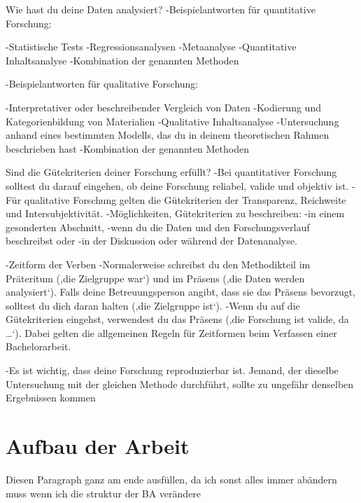     Wie hast du deine Daten analysiert?
        -Beispielantworten für quantitative Forschung:

            -Statistische Tests
            -Regressionsanalysen
            -Metaanalyse
            -Quantitative Inhaltsanalyse
            -Kombination der genannten Methoden

        -Beispielantworten für qualitative Forschung:

            -Interpretativer oder beschreibender Vergleich von Daten
            -Kodierung und Kategorienbildung von Materialien
            -Qualitative Inhaltsanalyse
            -Untersuchung anhand eines bestimmten Modells, das du in deinem theoretischen Rahmen beschrieben hast
            -Kombination der genannten Methoden

    Sind die Gütekriterien deiner Forschung erfüllt?
        -Bei quantitativer Forschung solltest du darauf eingehen, ob deine Forschung reliabel, valide und objektiv ist.
        -Für qualitative Forschung gelten die Gütekriterien der Transparenz, Reichweite und Intersubjektivität.
        -Möglichkeiten, Gütekriterien zu beschreiben:
            -in einem gesonderten Abschnitt,
            -wenn du die Daten und den Forschungsverlauf beschreibst oder
            -in der Diskussion oder während der Datenanalyse.
    
    -Zeitform der Verben
        -Normalerweise schreibst du den Methodikteil im Präteritum (‚die Zielgruppe war‘) und im Präsens (‚die Daten werden analysiert‘). Falls deine Betreuungsperson angibt, dass sie das Präsens bevorzugt, solltest du dich daran halten (‚die Zielgruppe ist‘).
        -Wenn du auf die Gütekriterien eingehst, verwendest du das Präsens (‚die Forschung ist valide, da …‘). Dabei gelten die allgemeinen Regeln für Zeitformen beim Verfassen einer Bachelorarbeit.


    -Es ist wichtig, dass deine Forschung reproduzierbar ist. Jemand, der dieselbe Untersuchung mit der gleichen Methode durchführt, sollte zu ungefähr denselben Ergebnissen kommen


\section{Aufbau der Arbeit}
\label{sec:Einführung:Aufbau der Arbeit}

Diesen Paragraph ganz am ende ausfüllen, da ich sonst alles immer abändern muss wenn ich die struktur der BA verändere

